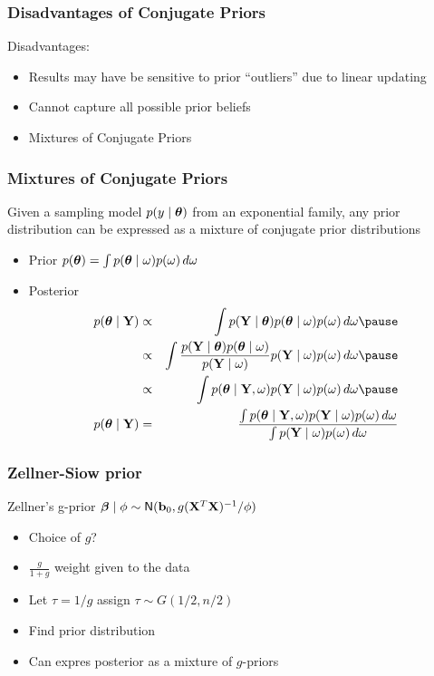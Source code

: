 \documentclass[handout]{beamer}
\begin{document}
\begin{frame}
  \frametitle{Disadvantages of Conjugate Priors}
  Disadvantages: \pause
\begin{itemize}
\item Results  may have be sensitive to prior ``outliers'' due to
  linear updating \pause
\vspace{1.5in}

\item Cannot capture all possible prior beliefs \pause
\item Mixtures of Conjugate Priors
\end{itemize}
\end{frame}
\begin{frame}
  \frametitle{Mixtures of Conjugate Priors}
  \begin{theorem}  Given a sampling model
  $p(y \mid \boldsymbol{\theta})$ from an exponential family, any prior distribution
  can be expressed as a mixture of conjugate prior distributions 
 \end{theorem}

 \begin{itemize}
 \item Prior $p(\boldsymbol{\theta}) = \int p(\boldsymbol{\theta} \mid \omega) p(\omega)\, d \omega$ \pause
 \item Posterior \pause
   \begin{eqnarray*}
   p(\t \mid \Y)  &\propto & \int p(\Y \mid \t) p(\t \mid \omega)
   p(\omega) \, d\omega \pause \\
 & \propto & \int  \frac{  p(\Y \mid \t) p(\t \mid \omega) } {p(\Y \mid
   \omega)}  p(\Y \mid
 \omega) p(\omega ) \, d \omega  \pause \\
& \propto & \int p(\t \mid \Y, \omega)  p(\Y \mid
 \omega) p(\omega ) \, d \omega \pause \\
 p(\t \mid \Y) & =  & \frac{\int p(\t \mid \Y, \omega)  p(\Y \mid
 \omega) p(\omega ) \, d \omega }
{\int p(\Y \mid
 \omega) p(\omega ) \, d \omega }
       \end{eqnarray*}

 \end{itemize}
\end{frame}

\begin{frame}
  \frametitle{Zellner-Siow prior}
Zellner's g-prior $\boldsymbol{\beta} \mid \phi \sim \textsf{N}(\mathbf{b}_0, g
    (\mathbf{X}^T\mathbf{X})^{-1}/\phi)$ \pause

\begin{itemize}
\item Choice of $g$?  \pause
\item $\frac{g}{1 + g}$  weight given to the data \pause
\item Let $\tau = 1/g$ assign $\tau \sim G(1/2, n/2)$
\item Find prior distribution
\item Can expres posterior as a mixture of $g$-priors
\end{itemize}
\end{frame}
\end{document}
